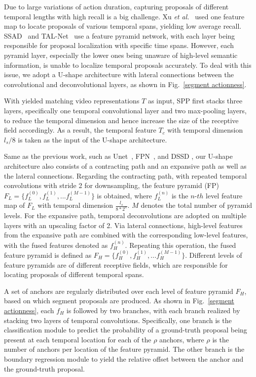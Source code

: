 \documentclass[10pt,twocolumn,letterpaper]{article}
\begin{document}
Due to large variations of action duration, capturing proposals of different temporal lengths with high recall is a big challenge. Xu \textit{et al.}~\cite{r-c3d} used one feature map to locate proposals of various temporal spans, yielding low average recall. SSAD~\cite{ssad} and TAL-Net~\cite{re_faster} use a feature pyramid network, with each layer being responsible for proposal localization with specific time spans. However, each pyramid layer, especially the lower ones being unaware of high-level semantic information, is unable to localize  temporal proposals accurately. To deal with this issue, we adopt a U-shape architecture with lateral connections between the convolutional and deconvolutional layers, as shown in Fig.~\ref{segment actionness}.

With yielded matching video representations $T$ as input, SPP first stacks three layers, specifically one temporal convolutional layer and two max-pooling layers, to reduce the temporal dimension and hence increase the size of the receptive field accordingly. As a result, the temporal feature $T_c$ with temporal dimension $l_s/8$ is taken as the input of the U-shape architecture.

Same as the previous work, such as Unet~\cite{unet}, FPN~\cite{fpn}, and DSSD \cite{dssd}, our U-shape architecture also consists of a contracting path and an expansive path as well as the lateral connections. Regarding the contracting path, with repeated temporal convolutions with stride 2 for downsampling, the feature pyramid (FP) $F_L= \{f_L^{(0)},f_L^{(1)},...f_L^{(M-1)}\}$ is obtained, where $f_L^{(n)}$ is the $n$-$th$ level  feature map of $F_L$ with  temporal dimension $\frac{l_s}{8*2^n}$. $M$ denotes the total number of pyramid levels.
For the expansive path, temporal deconvolutions are adopted on multiple layers with an upscaling factor of 2. Via lateral connections, high-level
features from the expansive path are combined with the corresponding low-level features, with the fused features denoted as $f_H^{(n)}$. Repeating this operation, the fused feature pyramid is defined as $F_H=\{f_H^{(0)},f_H^{(1)},...f_H^{(M-1)}\}$.  Different levels of feature pyramids are of different receptive fields, which are responsible for locating proposals of different temporal spans. 

 A set of anchors are regularly distributed over each level of feature pyramid $F_H$, based on which segment proposals are produced.  As shown in Fig.~\ref{segment actionness}, each $f_H$ is followed by two branches, with each branch realized by stacking two layers of temporal convolutions. Specifically, one branch is the classification module to predict the probability of a ground-truth proposal being present at each temporal location for each of the $\rho$ anchors, where $\rho$ is the number of anchors per location of the feature pyramid. The other branch is the boundary regression module to yield the relative offset between the anchor and the ground-truth proposal.
\end{document}
